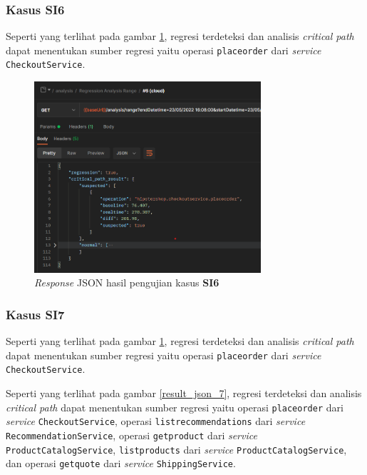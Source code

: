 \pagebreak

\subsubsection{Kasus SI6}
Seperti yang terlihat pada gambar \ref{result_json_6}, regresi terdeteksi dan analisis \textit{critical path} dapat menentukan sumber regresi yaitu operasi \texttt{placeorder} dari \textit{service} \texttt{CheckoutService}.
\begin{figure}[!htb]
	\centering
	\includegraphics[width=0.75\textwidth]{resources/ch4/json/6.png}
	\caption{\textit{Response} JSON hasil pengujian kasus \textbf{SI6}}
	\label{result_json_6}
\end{figure}


\subsubsection{Kasus SI7}
Seperti yang terlihat pada gambar \ref{result_json_6}, regresi terdeteksi dan analisis \textit{critical path} dapat menentukan sumber regresi yaitu operasi \texttt{placeorder} dari \textit{service} \texttt{CheckoutService}.

Seperti yang terlihat pada gambar \ref{result_json_7}, regresi terdeteksi dan analisis \textit{critical path} dapat menentukan sumber regresi yaitu operasi \texttt{placeorder} dari \textit{service} \texttt{CheckoutService}, operasi \texttt{listrecommendations} dari \textit{service} \texttt{RecommendationService}, operasi \texttt{getproduct} dari \textit{service} \texttt{ProductCatalogService}, \texttt{listproducts} dari \textit{service} \texttt{ProductCatalogService}, dan operasi \texttt{getquote} dari \textit{service} \texttt{ShippingService}.

